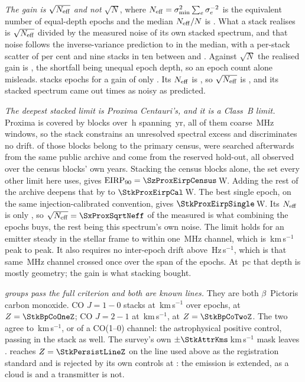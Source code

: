 \emph{The gain is $\sqrt{N_{\rm eff}}$ and not $\sqrt{N}$}, where
$N_{\rm eff}=\sigma_{\min}^{2}\sum_e\sigma_e^{-2}$ is the equivalent number of
equal-depth epochs and the median $N_{\rm eff}/N$ is \StkNeffFrac. What a
stack realises is $\sqrt{N_{\rm eff}}$ divided by the measured noise of its
own stacked spectrum, and that noise follows the inverse-variance prediction
to \StkGainVsNeff{} in the median, with a per-stack scatter of
\StkMadZScatterPct{} per cent and nine stacks in ten between \SzNoiseLo{} and
\SzNoiseHi. Against $\sqrt{N}$ the realised gain is \StkGainVsN, the
shortfall being unequal epoch depth, so an epoch count alone misleads.
\StkWorstStar{} stacks \StkWorstN{} epochs for a gain of only
\StkWorstGain. Its $N_{\rm eff}$ is \StkWorstNeff, so
$\sqrt{N_{\rm eff}}$ is \SzWorstSqrtNeff, and its stacked spectrum came out
\SzWorstNoise{} times as noisy as predicted.

\emph{The deepest stacked limit is Proxima Centauri's, and it is a Class~B
limit.} Proxima is covered by \StkProxN{} blocks over \StkProxHours\,h
spanning \StkProxSpanYr\,yr, all of them coarse \ChanBModeMHz\,MHz windows,
so the stack constrains an unresolved spectral excess and discriminates no
drift. \SxProxEbCensus{} of those blocks belong to the primary census,
\SzProxEbSearched{} were searched afterwards from the same public archive and
\SzProxEbHold{} come from the reserved hold-out, all observed over the census
blocks' own years. Stacking the census blocks alone, the set every other limit here uses,
gives $\mathrm{EIRP}_{90}=\SzProxEirpCensus$\,W. Adding the rest of the
archive deepens that by \SzProxDeepen{} to $\StkProxEirpCal$\,W. The best
single epoch, on the same injection-calibrated convention, gives
$\StkProxEirpSingle$\,W. Its $N_{\rm eff}$ is only \StkProxNeff, so
$\sqrt{N_{\rm eff}}=\SxProxSqrtNeff$ of the measured \StkProxGain{} is what
combining the epochs buys, the rest being this spectrum's own noise. The limit holds for an emitter steady in the stellar frame to within one
\ChanBModeMHz\,MHz channel, which is \StkProxTolKms\,km\,s$^{-1}$ peak to
peak. It also requires no inter-epoch drift above
\StkProxDriftHzS\,Hz\,s$^{-1}$, which is that same \ChanBModeMHz\,MHz channel
crossed once over the span of the epochs. At \StkProxDistPc\,pc that depth is mostly
geometry; the gain is what stacking bought.

\emph{\StkNSurvive{} groups pass the full criterion and both are known
lines.} They are both $\beta$~Pictoris carbon monoxide. CO $J=1\!-\!0$ stacks at
\StkBpCoOneOff\,km\,s$^{-1}$ over \StkBpCoOneN{} epochs, at
$Z=\StkBpCoOneZ$; CO $J=2\!-\!1$ at \StkBpCoTwoOff\,km\,s$^{-1}$, at
$Z=\StkBpCoTwoZ$. The two agree to \StkBpCrossKms\,km\,s$^{-1}$, or
\StkBpCrossChan{} of a CO(1--0) channel: the astrophysical positive control,
passing in the stack as well. The
survey's own $\pm\StkAttrKms$\,km\,s$^{-1}$ mask leaves
\StkUnattrClause. \StkPersistLineStar{} reaches
$Z=\StkPersistLineZ$ on the line used above as the registration standard and is
rejected by its own controls at \StkPersistLineCtrl: the emission is extended,
as a cloud is and a transmitter is not.

